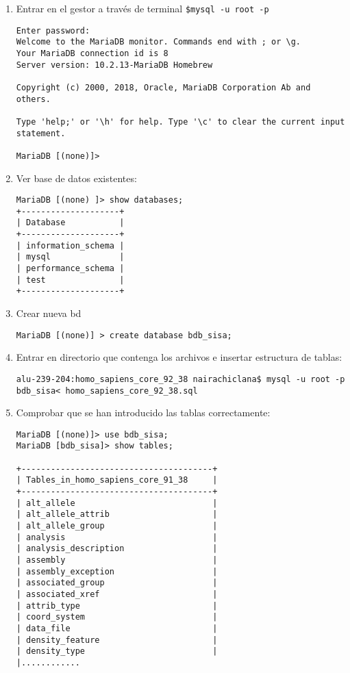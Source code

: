 \documentclass[12pt,a4paper]{article}
\begin{document}
\begin{enumerate}
\item Entrar en el gestor a través de terminal \cite{installMDB}
\verb|$mysql -u root -p|

\begin{verbatim}
Enter password:
Welcome to the MariaDB monitor. Commands end with ; or \g.
Your MariaDB connection id is 8
Server version: 10.2.13-MariaDB Homebrew

Copyright (c) 2000, 2018, Oracle, MariaDB Corporation Ab and others. 

Type 'help;' or '\h' for help. Type '\c' to clear the current input statement.

MariaDB [(none)]>
\end{verbatim}

\item Ver base de datos existentes:

\begin{verbatim}
MariaDB [(none) ]> show databases;
+--------------------+
| Database           |
+--------------------+
| information_schema |
| mysql              |
| performance_schema |
| test               |
+--------------------+
\end{verbatim}



\item Crear nueva bd
\begin{verbatim}
MariaDB [(none)] > create database bdb_sisa;
\end{verbatim}


\item Entrar en directorio que contenga los archivos e insertar estructura de tablas:

\begin{verbatim}
alu-239-204:homo_sapiens_core_92_38 nairachiclana$ mysql -u root -p 
bdb_sisa< homo_sapiens_core_92_38.sql
\end{verbatim}

\item Comprobar que se han introducido las tablas correctamente: 

\begin{verbatim}
MariaDB [(none)]> use bdb_sisa;
MariaDB [bdb_sisa]> show tables;

+---------------------------------------+
| Tables_in_homo_sapiens_core_91_38     |
+---------------------------------------+
| alt_allele                            |
| alt_allele_attrib                     |
| alt_allele_group                      |
| analysis                              |
| analysis_description                  |
| assembly                              |
| assembly_exception                    |
| associated_group                      |
| associated_xref                       |
| attrib_type                           |
| coord_system                          |
| data_file                             |
| density_feature                       |
| density_type                          |
|............                                 


\end{verbatim}
\end{enumerate}
\end{document}
